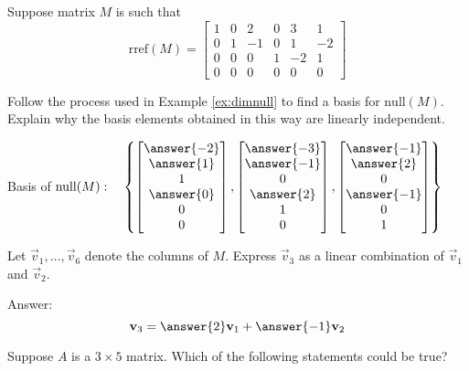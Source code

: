 \documentclass{ximera}
\begin{document}
\begin{problem}
Suppose matrix $M$ is such that 
$$\mbox{rref}(M)=\begin{bmatrix}1&0&2&0&3&1\\0&1&-1&0&1&-2\\0&0&0&1&-2&1\\0&0&0&0&0&0\end{bmatrix}$$

\begin{problem}
Follow the process used in Example \ref{ex:dimnull} to find a basis for $\mbox{null}(M)$.  Explain why the basis elements obtained in this way are linearly independent.

Basis of $\mbox{null}(M):\quad\left\{\begin{bmatrix}\answer{-2}\\\answer{1}\\1\\\answer{0}\\0\\0\end{bmatrix}, \begin{bmatrix}\answer{-3}\\\answer{-1}\\0\\\answer{2}\\1\\0\end{bmatrix}, \begin{bmatrix}\answer{-1}\\\answer{2}\\0\\\answer{-1}\\0\\1\end{bmatrix} \right\}$
\end{problem}

\begin{problem}
Let $\vec{v}_1,\ldots,\vec{v}_6$ denote the columns of $M$.  Express $\vec{v}_3$ as a linear combination of $\vec{v}_1$ and $\vec{v}_2$.

Answer:
$$\vec{v}_3=\answer{2}\vec{v}_1+\answer{-1}\vec{v}_2$$
\end{problem}
\end{problem}

\begin{problem}
Suppose $A$ is a $3\times 5$ matrix.  Which of the following statements could be true?
\begin{selectAll}
 \end{selectAll}
\end{problem}
\end{document}
